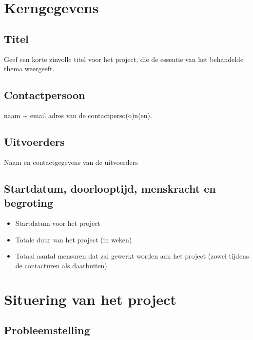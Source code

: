 \documentclass[10pt]{article}
\begin{document}
\newpage

\section{Kerngegevens}\label{sec:kerngegevens}

\subsection{Titel}\label{sec:Titel}

Geef een korte zinvolle titel voor het project, die de essentie van het behandelde thema weergeeft. 


\subsection{Contactpersoon} \label{sec:Contactpersoon}

naam + email adres van de contactperso(o)n(en).


\subsection{Uitvoerders}\label{sec:Uitvoerders}

Naam en contactgegevens van de uitvoerders


\subsection{Startdatum, doorlooptijd, menskracht en begroting}\label{sec:Startdatum}

\begin{itemize}
\item	Startdatum voor het project

\item	Totale duur van het project (in weken)

\item	Totaal aantal mensuren dat zal gewerkt worden aan het project (zowel tijdens de contacturen als daarbuiten).

\end{itemize}

\section{Situering van het project}\label{sec:Situering}

\subsection{Probleemstelling}\label{sec:Probleemstelling}
\end{document}
